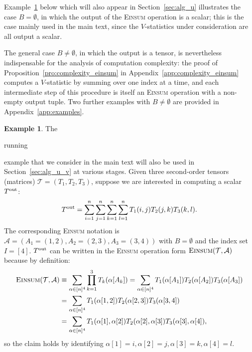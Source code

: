 \documentclass[sn-mathphys, natbib=false]{sn-jnl}
\theoremstyle{plain}
\theoremstyle{definition}
\newtheorem{example}{Example}
\def\Einsum{\textsc{Einsum}}
\newcommand{\tensorcontraction}{\textsc{Einsum}}
\newif\ifshowchanges
\newcommand{\rev}[1]{%
  \ifshowchanges
    {\color{red} #1}%
  \else
    #1%
  \fi
}
\def\calA{\mathcal{A}}
\def\calT{\mathcal{T}}
\begin{document}
\begin{bibunit}[agsm]
\rev{Example~\ref{eg:running} below which will also appear in Section~\ref{sec:alg_u} illustrates the case $B = \emptyset$, in which the output of the \Einsum{} operation is a scalar; this is the case mainly used in the main text, since the $V$-statistics under consideration are all output a scalar.

The general case $B \neq \emptyset$, in which the output is a tensor, is nevertheless indispensable for the  analysis of computation complexity: the proof of Proposition~\ref{pro:complexity_einsum} in Appendix~\ref{app:complexity_einsum} computes a $V$-statistic by summing over one index at a time, and each intermediate step of this procedure is itself an \Einsum{} operation with a non-empty output tuple. Two further examples with $B \neq \emptyset$ are provided in Appendix~\ref{app:examples}.}

\begin{example}
\label{eg:running}
The \rev{running} example that we consider in the main text will also be used in Section~\ref{sec:alg_u_v} at various stages. Given three second-order tensors (matrices) $\calT = (T_1, T_2, T_3)$, suppose we are interested in computing a scalar $T^{\rm out}$:
\begin{align*}
T^{\rm out} = \sum_{i = 1}^{n} \sum_{j = 1}^{n} \sum_{k = 1}^{n} \sum_{l = 1}^{n} T_1 (i, j) T_2 (j, k) T_3 (k, l).
\end{align*}
The corresponding \Einsum{} notation is $\calA = (A_1 = (1, 2), A_2 = (2, 3), A_3 = (3, 4))$ with $B = \emptyset$ and the index set $I = [4]$. $T^{\rm out}$ can be written in the \Einsum{} operation form $\tensorcontraction(\calT, \calA)$ because by definition:
\begin{align*}
\tensorcontraction(\calT, \calA) & \equiv \sum_{\alpha \in [n]^{4}} \prod_{k = 1}^{3} T_{k} (\alpha [A_k]) = \sum_{\alpha \in [n]^{4}} T_1 (\alpha [A_1]) T_2 (\alpha [A_2]) T_3 (\alpha [A_3]) \\
& = \sum_{\alpha \in [n]^{4}} T_1 (\alpha[1, 2]) T_2 (\alpha[2, 3]) T_3 (\alpha[3, 4]) \\
& = \sum_{\alpha \in [n]^{4}} T_1 (\alpha[1], \alpha[2]) T_2 (\alpha[2], \alpha[3]) T_3 (\alpha[3], \alpha[4]),
\end{align*}
so the claim holds by identifying $\alpha [1] = i, \alpha [2] = j, \alpha [3] = k, \alpha [4] = l$.
\end{example}

\iffalse
\begin{figure}[ht]
\centering
\begin{tikzpicture}[scale=1.2, every node/.style={scale=1.0}]


\end{tikzpicture}
\end{figure}
\end{bibunit}
\end{document}

